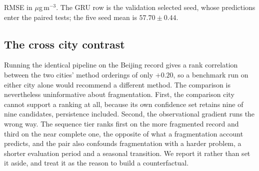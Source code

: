 \documentclass[conference]{IEEEtran}
\newcommand{\tablenote}[1]{%
  \par\vspace{2pt}%
  \parbox{\wd\tablebox}{\footnotesize #1\par}}
\newcommand{\ugm}{$\mu$g\,m$^{-3}$}
\begin{document}
\begin{table}[!t]
\caption{Test performance at the 24 hour horizon.}
\label{tab:headline}
\centering
\footnotesize
{}
\usebox{\tablebox}
\tablenote{RMSE in \ugm. The GRU row is the validation selected seed, whose
predictions enter the paired tests; the five seed mean is $57.70\pm0.44$.}
\end{table}

\subsection{The cross city contrast}

Running the identical pipeline on the Beijing record gives a rank correlation between the two
cities' method orderings of only $+0.20$, so a benchmark run on either city alone would
recommend a different method. The comparison is nevertheless uninformative about
fragmentation. First, the comparison city cannot support a ranking at all, because its own
confidence set retains nine of nine candidates, persistence included. Second, the observational
gradient runs the wrong way. The sequence tier ranks first on the more fragmented record and
third on the near complete one, the opposite of what a fragmentation account predicts, and the
pair also confounds fragmentation with a harder problem, a shorter evaluation period and a
seasonal transition. We report it rather than set it aside, and treat it as the reason to build
a counterfactual.
\end{document}
